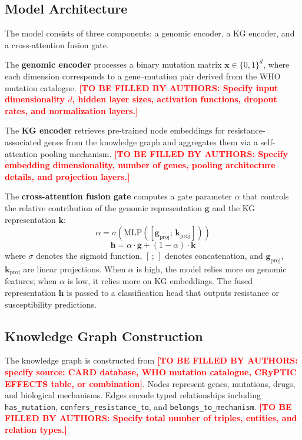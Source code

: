 \documentclass[conference]{IEEEtran}
\newcommand{\tbd}[1]{\textcolor{red}{\textbf{[TO BE FILLED BY AUTHORS: #1]}}}
\begin{document}
\subsection{Model Architecture}

The model consists of three components: a genomic encoder, a KG encoder, and a cross-attention fusion gate.

The \textbf{genomic encoder} processes a binary mutation matrix $\mathbf{x} \in \{0,1\}^{d}$, where each dimension corresponds to a gene--mutation pair derived from the WHO mutation catalogue. \tbd{Specify input dimensionality $d$, hidden layer sizes, activation functions, dropout rates, and normalization layers.}

The \textbf{KG encoder} retrieves pre-trained node embeddings for resistance-associated genes from the knowledge graph and aggregates them via a self-attention pooling mechanism. \tbd{Specify embedding dimensionality, number of genes, pooling architecture details, and projection layers.}

The \textbf{cross-attention fusion gate} computes a gate parameter $\alpha$ that controls the relative contribution of the genomic representation $\mathbf{g}$ and the KG representation $\mathbf{k}$:
\begin{equation}
    \alpha = \sigma\!\left(\mathrm{MLP}\!\left([\mathbf{g}_{\mathrm{proj}};\, \mathbf{k}_{\mathrm{proj}}]\right)\right)
\end{equation}
\begin{equation}
    \mathbf{h} = \alpha \cdot \mathbf{g} + (1 - \alpha) \cdot \mathbf{k}
\end{equation}
where $\sigma$ denotes the sigmoid function, $[\,;\,]$ denotes concatenation, and $\mathbf{g}_{\mathrm{proj}}$, $\mathbf{k}_{\mathrm{proj}}$ are linear projections. When $\alpha$ is high, the model relies more on genomic features; when $\alpha$ is low, it relies more on KG embeddings. The fused representation $\mathbf{h}$ is passed to a classification head that outputs resistance or susceptibility predictions.

\subsection{Knowledge Graph Construction}

The knowledge graph is constructed from \tbd{specify source: CARD database, WHO mutation catalogue, CRyPTIC EFFECTS table, or combination}. Nodes represent genes, mutations, drugs, and biological mechanisms. Edges encode typed relationships including \texttt{has\_mutation}, \texttt{confers\_resistance\_to}, and \texttt{belongs\_to\_mechanism}. \tbd{Specify total number of triples, entities, and relation types.}
\end{document}
